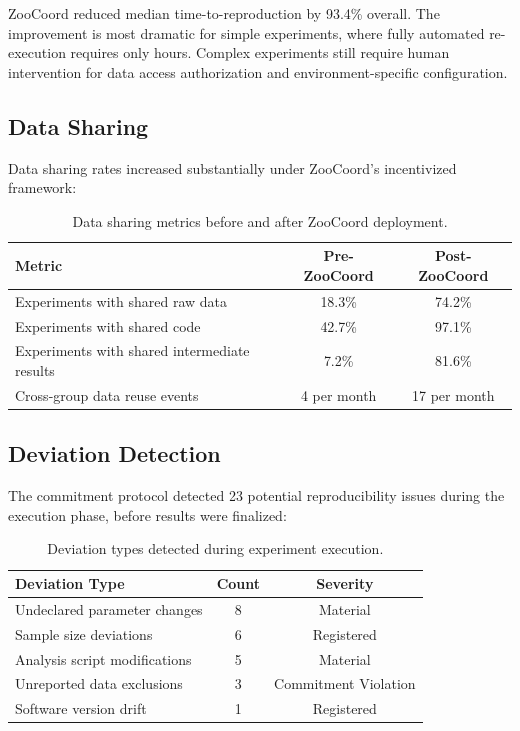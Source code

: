 \documentclass[11pt,a4paper]{article}
\begin{document}
ZooCoord reduced median time-to-reproduction by 93.4\% overall.
The improvement is most dramatic for simple experiments, where fully automated re-execution requires only hours.
Complex experiments still require human intervention for data access authorization and environment-specific configuration.

\subsection{Data Sharing}

Data sharing rates increased substantially under ZooCoord's incentivized framework:

\begin{table}[H]
\centering
\caption{Data sharing metrics before and after ZooCoord deployment.}
\label{tab:sharing}
\begin{tabular}{@{}lcc@{}}
\toprule
\textbf{Metric} & \textbf{Pre-ZooCoord} & \textbf{Post-ZooCoord} \\
\midrule
Experiments with shared raw data & 18.3\% & 74.2\% \\
Experiments with shared code & 42.7\% & 97.1\% \\
Experiments with shared intermediate results & 7.2\% & 81.6\% \\
Cross-group data reuse events & 4 per month & 17 per month \\
\bottomrule
\end{tabular}
\end{table}

\subsection{Deviation Detection}

The commitment protocol detected 23 potential reproducibility issues during the execution phase, before results were finalized:

\begin{table}[H]
\centering
\caption{Deviation types detected during experiment execution.}
\label{tab:deviations}
\begin{tabular}{@{}lcc@{}}
\toprule
\textbf{Deviation Type} & \textbf{Count} & \textbf{Severity} \\
\midrule
Undeclared parameter changes & 8 & Material \\
Sample size deviations & 6 & Registered \\
Analysis script modifications & 5 & Material \\
Unreported data exclusions & 3 & Commitment Violation \\
Software version drift & 1 & Registered \\
\bottomrule
\end{tabular}
\end{table}
\end{document}
